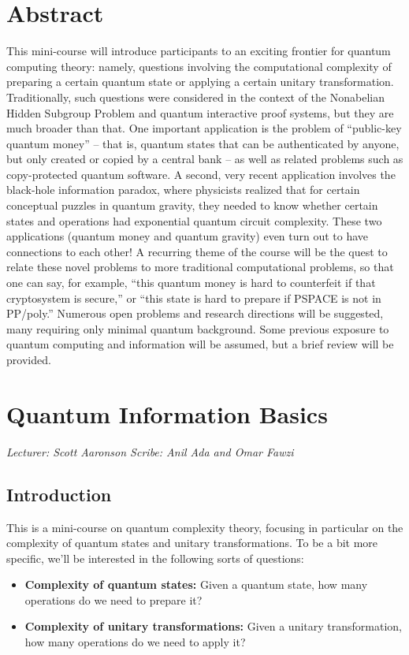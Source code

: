 \documentclass[11pt]{report}
\theoremstyle{plain}
\theoremstyle{definition}
\newcommand{\lecture}[3]{%
  \chapter{#3}%
  \vspace{-5ex}%
  \textit{Lecturer: #1 \hfill Scribe: #2}\par%
  \vspace{1ex}\titlerule\vspace{2ex}}
\begin{document}
\chapter*{Abstract}
This mini-course will introduce participants to an exciting frontier for quantum computing theory: namely, questions involving the computational complexity of preparing a certain quantum state or applying a certain unitary transformation. Traditionally, such questions were considered in the context of the Nonabelian Hidden Subgroup Problem and quantum interactive proof systems, but they are much broader than that. One important application is the problem of ``public-key quantum money'' -- that is, quantum states that can be authenticated by anyone, but only created or copied by a central bank -- as well as related problems such as copy-protected quantum software. A second, very recent application involves the black-hole information paradox, where physicists realized that for certain conceptual puzzles in quantum gravity, they needed to know whether certain states and operations had exponential quantum circuit complexity. These two applications (quantum money and quantum gravity) even turn out to have connections to each other! A recurring theme of the course will be the quest to relate these novel problems to more traditional computational problems, so that one can say, for example, ``this quantum money is hard to counterfeit if that cryptosystem is secure,'' or ``this state is hard to prepare if PSPACE is not in PP/poly.'' Numerous open problems and research directions will be suggested, many requiring only minimal quantum background. Some previous exposure to quantum computing and information will be assumed, but a brief review will be provided.

\lecture{Scott Aaronson}{Anil Ada and Omar Fawzi}{Quantum Information Basics}

\section{Introduction}

This is a mini-course on quantum complexity theory, focusing in particular on the complexity of quantum states and unitary transformations.
To be a bit more specific, we'll be interested in the following sorts of questions:
\begin{itemize}
    \item {\bf Complexity of quantum states:} Given a quantum state, how many operations do we need to prepare it?
    \item {\bf Complexity of unitary transformations:} Given a unitary transformation, how many operations do we need to apply it?
\end{itemize}
\end{document}
